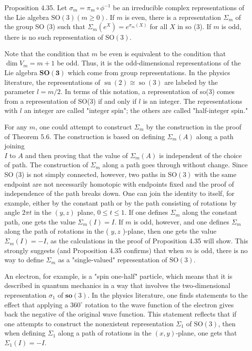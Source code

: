 \documentclass[10pt, letterpaper]{article}
\begin{document}
Proposition 4.35. Let $\sigma_{m}=\pi_{m} \circ \phi^{-1}$ be an irreducible complex representations of the Lie algebra $\mathrm{SO}(3)(m \geq 0)$. If $m$ is even, there is a representation $\Sigma_{m}$ of the group SO (3) such that $\Sigma_{m}\left(e^{X}\right)=e^{\sigma_{m}(X)}$ for all $X$ in so (3). If $m$ is odd, there is no such representation of $\mathrm{SO}(3)$.

Note that the condition that $m$ be even is equivalent to the condition that $\operatorname{dim} V_{m}=m+1$ be odd. Thus, it is the odd-dimensional representations of the Lie algebra $\mathbf{S O}(\mathbf{3})$ which come from group representations. In the physics literature, the representations of $\operatorname{su}(2) \cong \operatorname{so}(3)$ are labeled by the parameter $l=m / 2$. In terms of this notation, a representation of so(3) comes from a representation of SO(3) if and only if $l$ is an integer. The representations with $l$ an integer are called "integer spin"; the others are called "half-integer spin."

For any $m$, one could attempt to construct $\Sigma_{m}$ by the construction in the proof of Theorem 5.6. The construction is based on defining $\Sigma_{m}(A)$ along a path joining\\
$I$ to $A$ and then proving that the value of $\Sigma_{m}(A)$ is independent of the choice of path. The construction of $\Sigma_{m}$ along a path goes through without change. Since SO (3) is not simply connected, however, two paths in $\mathrm{SO}(3)$ with the same endpoint are not necessarily homotopic with endpoints fixed and the proof of independence of the path breaks down. One can join the identity to itself, for example, either by the constant path or by the path consisting of rotations by angle $2 \pi t$ in the $(y, z)$ plane, $0 \leq t \leq 1$. If one defines $\Sigma_{m}$ along the constant path, one gets the value $\Sigma_{m}(I)=I$. If $m$ is odd, however, and one defines $\Sigma_{m}$ along the path of rotations in the ( $y, z$ )-plane, then one gets the value $\Sigma_{m}(I)=-I$, as the calculations in the proof of Proposition 4.35 will show. This strongly suggests (and Proposition 4.35 confirms) that when $m$ is odd, there is no way to define $\Sigma_{m}$ as a "single-valued" representation of $\mathrm{SO}(3)$.

An electron, for example, is a "spin one-half" particle, which means that it is described in quantum mechanics in a way that involves the two-dimensional representation $\sigma_{1}$ of $\mathbf{s o}(3)$. In the physics literature, one finds statements to the effect that applying a $360^{\circ}$ rotation to the wave function of the electron gives back the negative of the original wave function. This statement reflects that if one attempts to construct the nonexistent representation $\Sigma_{1}$ of $\mathrm{SO}(3)$, then when defining $\Sigma_{1}$ along a path of rotations in the $(x, y)$-plane, one gets that $\Sigma_{1}(I)=-I$.
\end{document}
